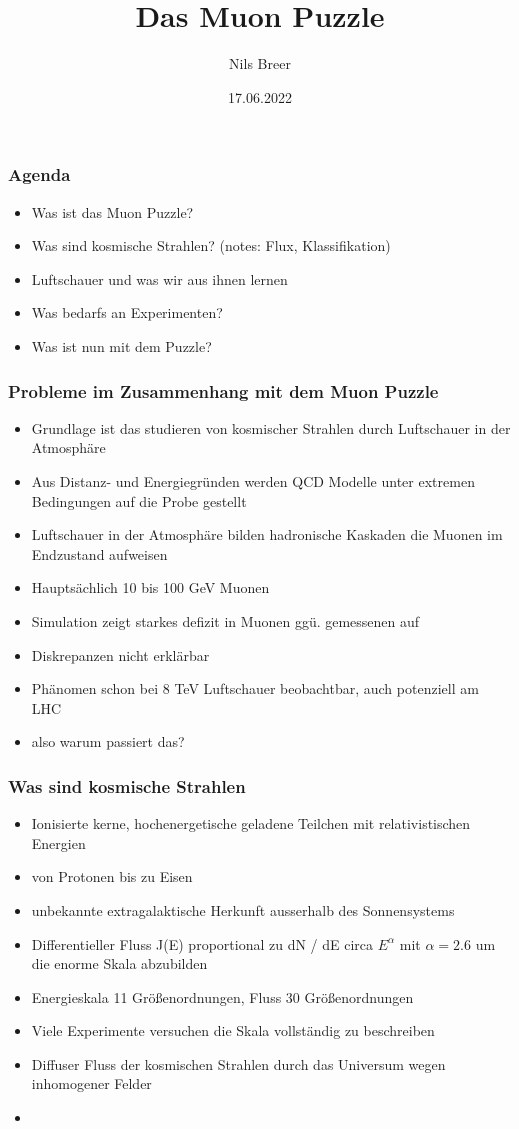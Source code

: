 \documentclass[aspectratio=1610, 9pt]{beamer}
\title{Das Muon Puzzle}
\author[N.Breer]{Nils Breer}
\institute{Fakultät Physik}
\date{17.06.2022}
\begin{document}
\maketitle

\begin{frame}\frametitle{Agenda}
  \begin{itemize}
    \item Was ist das Muon Puzzle?
    \item Was sind kosmische Strahlen? (notes: Flux, Klassifikation)
    \item Luftschauer und was wir aus ihnen lernen
    \item Was bedarfs an Experimenten?
    \item Was ist nun mit dem Puzzle?
  \end{itemize}
\end{frame}

\begin{frame}\frametitle{Probleme im Zusammenhang mit dem Muon Puzzle}
  \begin{itemize}
    \item Grundlage ist das studieren von kosmischer Strahlen durch Luftschauer
    in der Atmosphäre
    \item Aus Distanz- und Energiegr\"unden werden QCD Modelle unter extremen
    Bedingungen auf die Probe gestellt
    \item Luftschauer in der Atmosphäre bilden hadronische Kaskaden die Muonen
    im Endzustand aufweisen
    \item Hauptsächlich 10 bis 100 GeV Muonen
    \item Simulation zeigt starkes defizit in Muonen gg\"u. gemessenen auf
    \item Diskrepanzen nicht erklärbar
    \item Phänomen schon bei 8 TeV Luftschauer beobachtbar, auch potenziell am LHC
    \item also warum passiert das?
  \end{itemize}
\end{frame}

\begin{frame}\frametitle{Was sind kosmische Strahlen}
  \begin{itemize}
    \item Ionisierte kerne, hochenergetische geladene Teilchen mit relativistischen
    Energien
    \item von Protonen bis zu Eisen
    \item unbekannte extragalaktische Herkunft ausserhalb des Sonnensystems
    \item Differentieller Fluss J(E) proportional zu dN / dE circa $E^\alpha$
    mit $\alpha = 2.6$ um die enorme Skala abzubilden
    \item Energieskala 11 Größenordnungen, Fluss 30 Größenordnungen
    \item Viele Experimente versuchen die Skala vollständig zu beschreiben
    \item Diffuser Fluss der kosmischen Strahlen durch das Universum wegen
    inhomogener Felder
    \item
  \end{itemize}
\end{frame}
\end{document}
